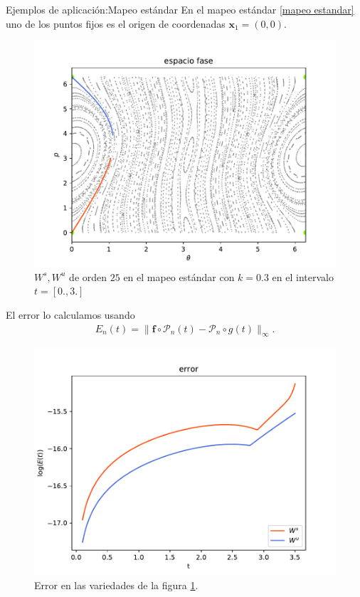 \documentclass[11pt]{beamer}
\theoremstyle{definition}
\begin{document}
\begin{frame}{Ejemplos de aplicaci\'on:Mapeo est\'andar}
En el mapeo estándar \eqref{mapeo estandar} uno de los puntos fijos es el origen de coordenadas $\mathbf{x}_{1}=(0,0)$.
\begin{figure}[H]
	\centering
	\includegraphics[scale=0.4]{k03}
	\caption{\footnotesize $W^{s},W^{u}$ de orden $25$ en el mapeo estándar con $k=0.3$ en el intervalo $t=[0.,3.]$}
	\label{estandar03}
\end{figure}
\end{frame}
\begin{frame}
El error lo calculamos usando 
\begin{eqnarray*}
E_{n}(t) = \parallel \mathbf{f} \circ \mathcal{P}_{n}(t) - \mathcal{P}_{n} \circ g(t) \parallel_{\infty}.
\end{eqnarray*}
\begin{figure}[H]
	\centering
	\includegraphics[scale=0.5]{errork03} 
	\caption{Error en las variedades de la figura \ref{estandar03}.}
	\label{error est k03}
\end{figure}
\end{frame}
\end{document}
